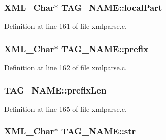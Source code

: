 \subsubsection[{\texorpdfstring{local\+Part}{localPart}}]{ {\bf X\+M\+L\+\_\+\+Char}$\ast$ T\+A\+G\+\_\+\+N\+A\+M\+E\+::local\+Part}\hypertarget{struct_t_a_g___n_a_m_e_a92bf2e39dc1e8b44f7fd5dcf8d8567c2}{}\label{struct_t_a_g___n_a_m_e_a92bf2e39dc1e8b44f7fd5dcf8d8567c2}


Definition at line 161 of file xmlparse.\+c.

\subsubsection[{\texorpdfstring{prefix}{prefix}}]{ {\bf X\+M\+L\+\_\+\+Char}$\ast$ T\+A\+G\+\_\+\+N\+A\+M\+E\+::prefix}\hypertarget{struct_t_a_g___n_a_m_e_ae2f03597abbab572e43df491d91b95d0}{}\label{struct_t_a_g___n_a_m_e_ae2f03597abbab572e43df491d91b95d0}


Definition at line 162 of file xmlparse.\+c.

\subsubsection[{\texorpdfstring{prefix\+Len}{prefixLen}}]{ T\+A\+G\+\_\+\+N\+A\+M\+E\+::prefix\+Len}\hypertarget{struct_t_a_g___n_a_m_e_a682989d51ef2a858da71ff3051377264}{}\label{struct_t_a_g___n_a_m_e_a682989d51ef2a858da71ff3051377264}


Definition at line 165 of file xmlparse.\+c.

\subsubsection[{\texorpdfstring{str}{str}}]{ {\bf X\+M\+L\+\_\+\+Char}$\ast$ T\+A\+G\+\_\+\+N\+A\+M\+E\+::str}\hypertarget{struct_t_a_g___n_a_m_e_a99c105fe5bfd6a95e0640182522f5d3c}{}\label{struct_t_a_g___n_a_m_e_a99c105fe5bfd6a95e0640182522f5d3c}


